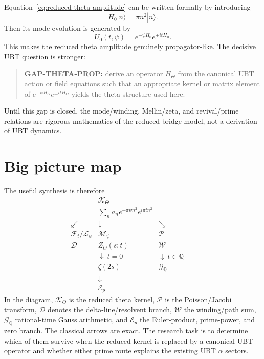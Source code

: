 Equation~\eqref{eq:reduced-theta-amplitude} can be written formally by introducing
\begin{equation}
 H_0|n\rangle=\pi n^2|n\rangle.
\end{equation}
Then its mode evolution is generated by
\begin{equation}
 U_0(t,\psi)=e^{-\psi H_0}e^{+itH_0}.
 \label{eq:formal-complex-propagator}
\end{equation}
This makes the reduced theta amplitude genuinely propagator-like.  The decisive UBT
question is stronger:
\begin{quote}
\textbf{GAP-THETA-PROP:} derive an operator $H_\Theta$ from the canonical UBT action or
field equations such that an appropriate kernel or matrix element of
$e^{-\psi H_\Theta}e^{\pm itH_\Theta}$ yields the theta structure used here.
\end{quote}
Until this gap is closed, the mode/winding, Mellin/zeta, and revival/prime relations are
rigorous mathematics of the reduced bridge model, not a derivation of UBT dynamics.

\section{Big picture map}

The useful synthesis is therefore
\begin{equation}
\boxed{
\begin{array}{ccccc}
 & \mathcal K_\Theta & & &\\
 & \displaystyle\sum_n a_n e^{-\pi\psi n^2}e^{i\pi t n^2} & & &\\[2mm]
 \swarrow & \downarrow & \searrow & &\\[-1mm]
 \mathcal F_t/\mathcal L_\psi & \mathcal M_\psi & \mathcal P & &\\
 \mathcal D & Z_\Theta(s;t) & \mathcal W & &\\
 & \downarrow\ t=0 & \downarrow\ t\in\mathbb Q & &\\
 & \zeta(2s) & \mathcal G_{\mathbb Q} & &\\
 & \downarrow & & &\\
 & \mathcal E_p & & &
\end{array}}
\end{equation}
In the diagram, $\mathcal K_\Theta$ is the reduced theta kernel,
$\mathcal P$ is the Poisson/Jacobi transform, $\mathcal D$ denotes the
delta-line/resolvent branch, $\mathcal W$ the winding/path sum,
$\mathcal G_{\mathbb Q}$ rational-time Gauss arithmetic, and $\mathcal E_p$
the Euler-product, prime-power, and zero branch.
The classical arrows are exact.  The research task is to determine which of them survive
when the reduced kernel is replaced by a canonical UBT operator and whether either prime
route explains the existing UBT $\alpha$ sectors.
